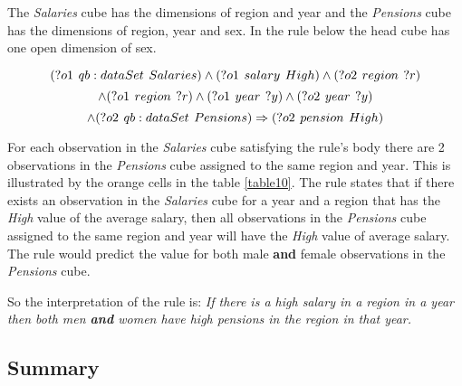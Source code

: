 The \textit{Salaries} cube has the dimensions of region and year and the \textit{Pensions} cube has the dimensions of region, year and sex. In the rule below the head cube has one open dimension of sex. 

\begin{minipage}{\textwidth}
$$
(?o1\hspace{0.4em}qb:dataSet\hspace{0.4em}Salaries) \land (?o1\hspace{0.4em}salary\hspace{0.4em}High) \land (?o2\hspace{0.4em}region\hspace{0.4em}?r)
$$
$$
\land (?o1\hspace{0.4em}region\hspace{0.4em}?r) \land (?o1\hspace{0.4em}year\hspace{0.4em}?y) \land (?o2\hspace{0.4em}year\hspace{0.4em}?y)
$$
$$
\land (?o2\hspace{0.4em}qb:dataSet\hspace{0.4em}Pensions) \Rightarrow (?o2\hspace{0.4em}pension\hspace{0.4em}High)
$$
\end{minipage}

For each observation in the \textit{Salaries} cube satisfying the rule's body there are 2 observations in the \textit{Pensions} cube assigned to the same region and year. This is illustrated by the orange cells in the table \ref{table10}. The rule states that if there exists an observation in the \textit{Salaries} cube for a year and a region that has the \textit{High} value of the average salary, then all observations in the \textit{Pensions} cube assigned to the same region and year will have the \textit{High} value of average salary. The rule would predict the value for both male \textbf{and} female observations in the \textit{Pensions} cube.

So the interpretation of the rule is: \textit{If there is a high salary in a region in a year then both men \textbf{and} women have high pensions in the region in that year.} 

\subsection{Summary}

